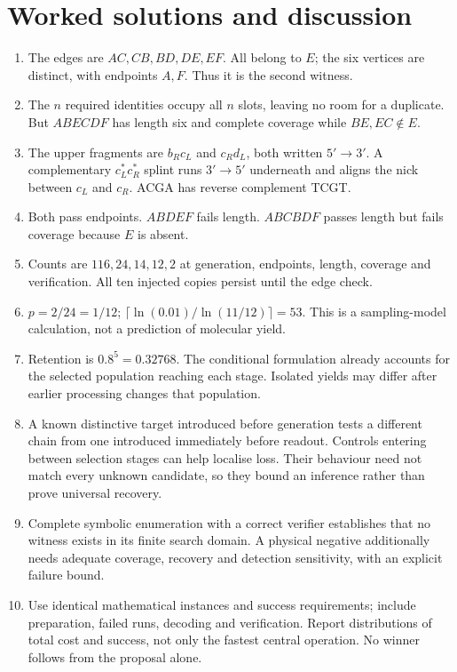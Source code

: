 \section{Worked solutions and discussion}\label{sec:solutions}
\begin{enumerate}
\item The edges are $AC,CB,BD,DE,EF$. All belong to $E$; the six vertices are
distinct, with endpoints $A,F$. Thus it is the second witness.
\item The $n$ required identities occupy all $n$ slots, leaving no room for a
duplicate. But $ABECDF$ has length six and complete coverage while $BE,EC\notin E$.
\item The upper fragments are $b_Rc_L$ and $c_Rd_L$, both written $5'\to3'$. A
complementary $c_L^{*}c_R^{*}$ splint runs $3'\to5'$ underneath and aligns the
nick between $c_L$ and $c_R$. ACGA has reverse complement TCGT.
\item Both pass endpoints. $ABDEF$ fails length. $ABCBDF$ passes length but fails
coverage because $E$ is absent.
\item Counts are $116,24,14,12,2$ at generation, endpoints, length, coverage and
verification. All ten injected copies persist until the edge check.
\item $p=2/24=1/12$; $\lceil\ln(0.01)/\ln(11/12)\rceil=53$. This is a
sampling-model calculation, not a prediction of molecular yield.
\item Retention is $0.8^5=0.32768$. The conditional formulation already accounts
for the selected population reaching each stage. Isolated yields may differ after
earlier processing changes that population.
\item A known distinctive target introduced before generation tests a different
chain from one introduced immediately before readout. Controls entering between
selection stages can help localise loss. Their behaviour need not match every
unknown candidate, so they bound an inference rather than prove universal
recovery.
\item Complete symbolic enumeration with a correct verifier establishes that no
witness exists in its finite search domain. A physical negative additionally
needs adequate coverage, recovery and detection sensitivity, with an explicit
failure bound.
\item Use identical mathematical instances and success requirements; include
preparation, failed runs, decoding and verification. Report distributions of
total cost and success, not only the fastest central operation. No winner follows
from the proposal alone.
\end{enumerate}

